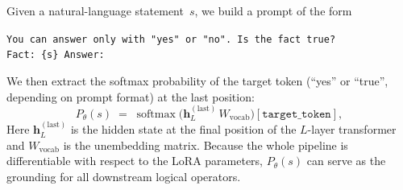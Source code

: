 \documentclass[11pt,a4paper]{article}
\begin{document}
Given a natural-language statement~$s$, we build a prompt of the form

\begin{center}
\texttt{You can answer only with "yes" or "no". Is the fact true?\\
Fact: \{s\} Answer:}
\end{center}

\noindent We then extract the softmax probability of the target token
(``yes'' or ``true'', depending on prompt format) at the last position:
\begin{equation}\label{eq:prob}
  P_\theta(s) \;=\; \operatorname{softmax}\!\bigl(
    \mathbf{h}_L^{(\text{last})}\,W_{\text{vocab}}
  \bigr)[\texttt{target\_token}],
\end{equation}
Here $\mathbf{h}_L^{(\text{last})}$ is the hidden state at the final
position of the $L$-layer transformer and $W_{\text{vocab}}$ is the
unembedding matrix.  Because the whole pipeline is differentiable with
respect to the LoRA parameters, $P_\theta(s)$ can serve as the grounding
for all downstream logical operators.
\end{document}
